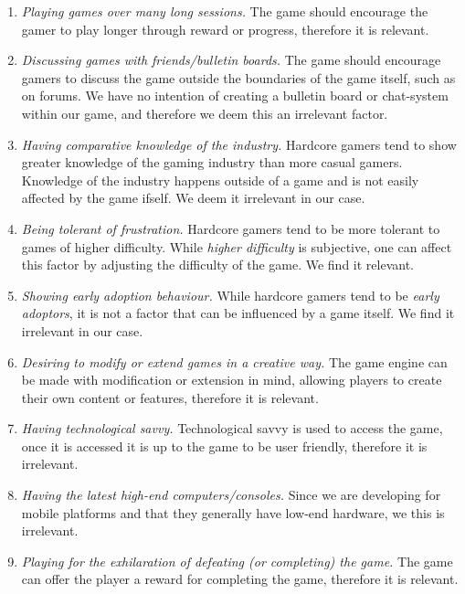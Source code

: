 \begin{enumerate}
\item \emph{Playing games over many long sessions.}
The game should encourage the gamer to play longer through reward or progress, therefore it is relevant.

\item \emph{Discussing games with friends/bulletin boards.}
The game should encourage gamers to discuss the game outside the boundaries of the game itself, such as on forums.
We have no intention of creating a bulletin board or chat-system within our game, and therefore we deem this an irrelevant factor.

\item \emph{Having comparative knowledge of the industry.}
Hardcore gamers tend to show greater knowledge of the gaming industry than more casual gamers.
Knowledge of the industry happens outside of a game and is not easily affected by the game ifself. We deem it irrelevant in our case.

\item \emph{Being tolerant of frustration.}
Hardcore gamers tend to be more tolerant to games of higher difficulty.
While \textit{higher difficulty} is subjective, one can affect this factor by adjusting the difficulty of the game.
We find it relevant.

\item \emph{Showing early adoption behaviour.}
While hardcore gamers tend to be \textit{early adoptors}, it is not a factor that can be influenced by a game itself.
We find it irrelevant in our case.

\item \emph{Desiring to modify or extend games in a creative way.}
The game engine can be made with modification or extension in mind, allowing players to create their own content or features, therefore it is relevant.

\item \emph{Having technological savvy.}
Technological savvy is used to access the game, once it is accessed it is up to the game to be user friendly, therefore it is irrelevant.

\item \emph{Having the latest high-end computers/consoles.}
Since we are developing for mobile platforms and that they generally have low-end hardware, we this is irrelevant.

\item \emph{Playing for the exhilaration of defeating (or completing) the game.}
The game can offer the player a reward for completing the game, therefore it is relevant.


\end{enumerate}
